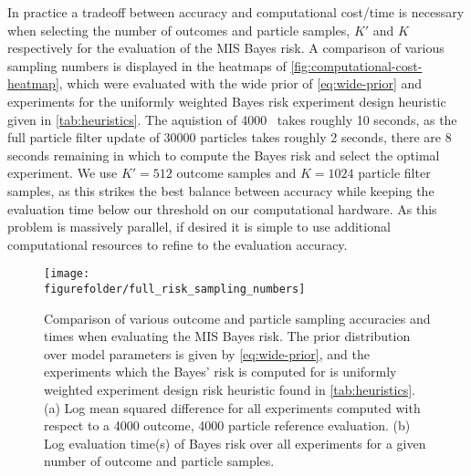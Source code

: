 \documentclass[aps,nofootinbib,twocolumn,superscriptaddress]{revtex4}
\newcommand{\figurefolder}{../fig}
\newcommand{\ESM}{\text{ESM}}
\begin{document}
In practice a tradeoff between accuracy and computational cost/time is necessary
when selecting the number of outcomes and particle samples, $K'$ and $K$
respectively for the evaluation of the MIS Bayes risk.
A comparison of various sampling numbers is displayed in the heatmaps of
\autoref{fig:computational-cost-heatmap}, which were evaluated with the wide
prior of \autoref{eq:wide-prior} and experiments for the uniformly weighted
Bayes risk experiment design heuristic given in \autoref{tab:heuristics}.
The aquistion of 4000 \ESM\ takes roughly 10 seconds, as the full particle
filter update of 30000 particles takes roughly 2 seconds, there are 8 seconds
remaining in which to compute the Bayes risk and select the optimal experiment.
We use $K'=512$ outcome samples and $K=1024$ particle filter samples, as this
strikes the best balance between accuracy while keeping the evaluation time
below our threshold on our computational hardware.
As this problem is massively parallel, if desired it is simple to use additional
computational resources to refine to the evaluation accuracy.

\begin{figure*}
    \texttt{[image: \\figurefolder/full\_risk\_sampling\_numbers]}
    \caption{Comparison of various outcome and particle sampling accuracies and
        times when evaluating the MIS Bayes risk.
        The prior distribution over model parameters is given by
        \autoref{eq:wide-prior}, and the experiments which the Bayes' risk is
        computed for is uniformly weighted experiment design risk heuristic
        found in \autoref{tab:heuristics}. (a) Log mean squared difference for
        all experiments computed with respect to a 4000 outcome, 4000 particle
        reference evaluation. (b) Log evaluation time(s) of Bayes risk over all
        experiments for a given number of outcome and particle samples.}
    \label{fig:computational-cost-heatmap}
\end{figure*}
\end{document}
